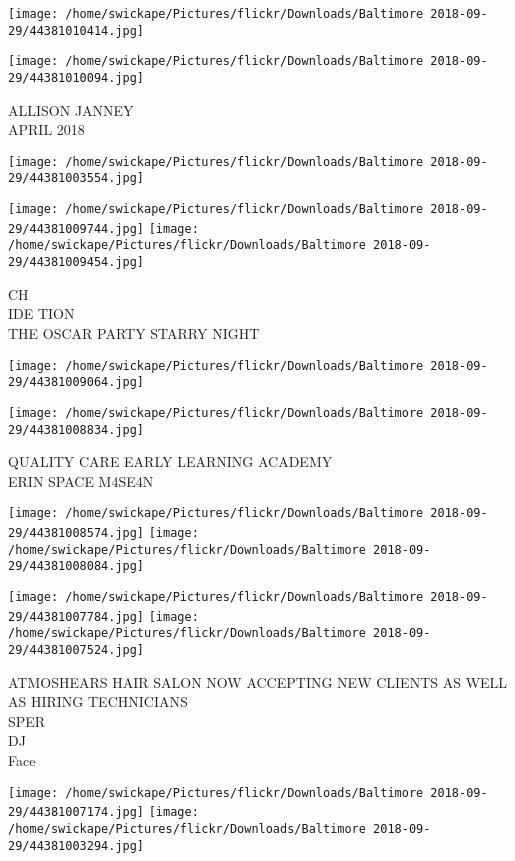 \documentclass[10pt,letterpaper]{article}
\begin{document}
\texttt{[image: /home/swickape/Pictures/flickr/Downloads/Baltimore 2018-09-29/44381010414.jpg]}

\vspace{0.25in}
\texttt{[image: /home/swickape/Pictures/flickr/Downloads/Baltimore 2018-09-29/44381010094.jpg]}

ALLISON JANNEY\\
APRIL 2018
\pagebreak

\texttt{[image: /home/swickape/Pictures/flickr/Downloads/Baltimore 2018-09-29/44381003554.jpg]}

\vspace{0.25in}
\texttt{[image: /home/swickape/Pictures/flickr/Downloads/Baltimore 2018-09-29/44381009744.jpg]}
\texttt{[image: /home/swickape/Pictures/flickr/Downloads/Baltimore 2018-09-29/44381009454.jpg]}

CH\\
IDE TION\\
THE OSCAR PARTY STARRY NIGHT
\pagebreak

\texttt{[image: /home/swickape/Pictures/flickr/Downloads/Baltimore 2018-09-29/44381009064.jpg]}

\vspace{0.25in}
\texttt{[image: /home/swickape/Pictures/flickr/Downloads/Baltimore 2018-09-29/44381008834.jpg]}

QUALITY CARE EARLY LEARNING ACADEMY\\
ERIN SPACE M4SE4N
\pagebreak

\texttt{[image: /home/swickape/Pictures/flickr/Downloads/Baltimore 2018-09-29/44381008574.jpg]}
\texttt{[image: /home/swickape/Pictures/flickr/Downloads/Baltimore 2018-09-29/44381008084.jpg]}

\texttt{[image: /home/swickape/Pictures/flickr/Downloads/Baltimore 2018-09-29/44381007784.jpg]}
\texttt{[image: /home/swickape/Pictures/flickr/Downloads/Baltimore 2018-09-29/44381007524.jpg]}

ATMOSHEARS HAIR SALON NOW ACCEPTING NEW CLIENTS AS WELL AS HIRING TECHNICIANS\\
SPER\\
DJ\\
Face
\pagebreak

\texttt{[image: /home/swickape/Pictures/flickr/Downloads/Baltimore 2018-09-29/44381007174.jpg]}
\texttt{[image: /home/swickape/Pictures/flickr/Downloads/Baltimore 2018-09-29/44381003294.jpg]}
\end{document}
